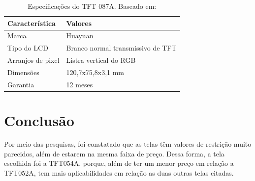 \begin{table}[ht]
\caption{Especificações do TFT 087A. Baseado em: \cite{monitor_lcd}}
\centering
\begin{tabular}{| l |  p{10cm} |}
\hline
Característica & Valores \\
\hline
Marca & Huayuan \\
\hline
Tipo do LCD & Branco normal transmissivo de TFT \\
\hline
Arranjos de pixel & Listra vertical do RGB \\
\hline
Dimensões & 120,7x75,8x3,1 mm \\
\hline
Garantia & 12 meses \\
\hline
\end{tabular}
\label{table:table_tft87a}
\end{table}

\section{Conclusão}
Por meio das pesquisas, foi constatado que as telas têm valores de restrição
 muito parecidos, além de estarem na mesma faixa de preço. Dessa forma, a
  tela escolhida foi a TFT054A, porque, além de ter um menor preço em relação a
  TFT052A, tem mais aplicabilidades em relação as duas outras telas citadas.
